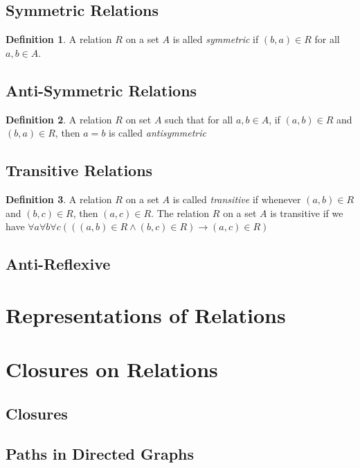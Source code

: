 \documentclass[11pt]{book} %
\theoremstyle {definition}
\newtheorem {definition}{Definition}[section]
\theoremstyle {remark}
\begin{document}
    \subsection {Symmetric Relations}
    \begin {definition}
    A relation $R$ on a set $A$ is alled \textit{symmetric} if $(b,a) \in R$ for all $a,b \in A$.
    \end {definition} 
    
    \subsection {Anti-Symmetric Relations}
    \begin {definition}
    A relation $R$ on set $A$ such that for all $a,b \in A$, if $(a,b) \in R$ and $(b,a) \in R$, then $a=b$ is called \textit{antisymmetric}
    \end {definition}
    
    \subsection {Transitive Relations}
    \begin {definition}
    A relation $R$ on a set $A$ is called \textit{transitive} if whenever $(a,b)\in R$ and $(b,c) \in R$, then $(a,c) \in R$. The relation $R$ on a set $A$ is transitive if we have $\forall a \forall b \forall c (((a,b) \in R \land (b,c) \in R) \rightarrow (a,c) \in R)$
    \end {definition}
    
    \subsection {Anti-Reflexive}


\section{Representations of Relations}

\section{Closures on Relations}
  \subsection{Closures}
  \subsection{Paths in Directed Graphs}
\end{document}
